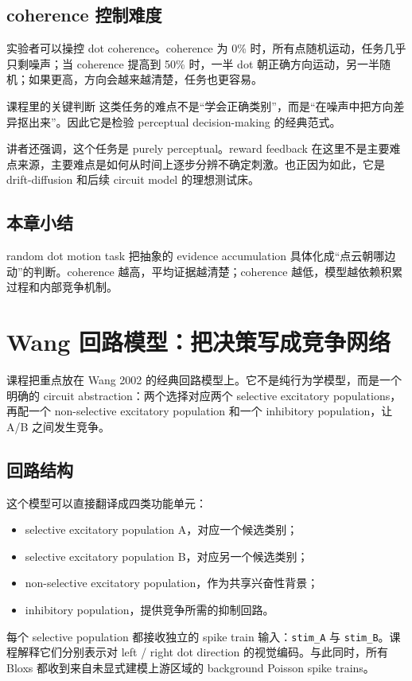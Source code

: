 \documentclass[a4paper]{article}
\begin{document}
\subsection{coherence 控制难度}
实验者可以操控 dot coherence。coherence 为 0\% 时，所有点随机运动，任务几乎只剩噪声；当 coherence 提高到 50\% 时，一半 dot 朝正确方向运动，另一半随机；如果更高，方向会越来越清楚，任务也更容易。

\begin{importantbox}{课程里的关键判断}
这类任务的难点不是“学会正确类别”，而是“在噪声中把方向差异抠出来”。因此它是检验 perceptual decision-making 的经典范式。
\end{importantbox}

讲者还强调，这个任务是 purely perceptual。reward feedback 在这里不是主要难点来源，主要难点是如何从时间上逐步分辨不确定刺激。也正因为如此，它是 drift-diffusion 和后续 circuit model 的理想测试床。

\subsection{本章小结}
random dot motion task 把抽象的 evidence accumulation 具体化成“点云朝哪边动”的判断。coherence 越高，平均证据越清楚；coherence 越低，模型越依赖积累过程和内部竞争机制。

\section{Wang 回路模型：把决策写成竞争网络}
课程把重点放在 Wang 2002 的经典回路模型上。它不是纯行为学模型，而是一个明确的 circuit abstraction：两个选择对应两个 selective excitatory populations，再配一个 non-selective excitatory population 和一个 inhibitory population，让 A/B 之间发生竞争。

\subsection{回路结构}
这个模型可以直接翻译成四类功能单元：
\begin{itemize}
    \item selective excitatory population A，对应一个候选类别；
    \item selective excitatory population B，对应另一个候选类别；
    \item non-selective excitatory population，作为共享兴奋性背景；
    \item inhibitory population，提供竞争所需的抑制回路。
\end{itemize}
每个 selective population 都接收独立的 spike train 输入：\texttt{stim\_A} 与 \texttt{stim\_B}。课程解释它们分别表示对 left / right dot direction 的视觉编码。与此同时，所有 Bloxs 都收到来自未显式建模上游区域的 background Poisson spike trains。
\end{document}
